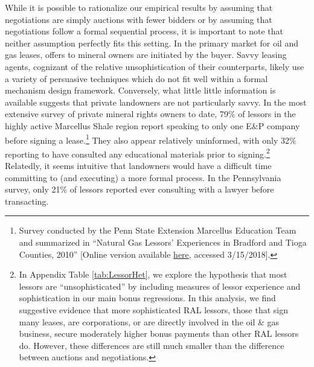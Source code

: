 While it is possible to rationalize our empirical results by assuming that negotiations are simply auctions with fewer bidders or by assuming that negotiations follow a formal sequential process, it is important to note that neither assumption perfectly fits this setting. In the primary market for oil and gas leases, offers to mineral owners are initiated by the buyer. Savvy leasing agents, cognizant of the relative unsophistication of their counterparts, likely use a variety of persuasive techniques which do not fit well within a formal mechanism design framework. Conversely, what little little information is available suggests that private landowners are not particularly savvy.  In the most extensive survey of private mineral rights owners to date, 79\% of lessors in the highly active Marcellus Shale region report speaking to only one E\&P company before signing a lease.\footnote{Survey conducted by the Penn State Extension Marcellus Education Team and summarized in ``Natural Gas Lessors' Experiences in Bradford and Tioga Counties, 2010'' [Online version available \hyperlink{https://extension.psu.edu/natural-gas-lessors-experiences-in-bradford-and-tioga-counties-2010-1}{here}, accessed 3/15/2018].} They also appear relatively uninformed, with only 32\% reporting to have consulted any educational materials prior to signing.\footnote{In Appendix Table \ref{tab:LessorHet}, we explore the hypothesis that most lessors are ``unsophisticated'' by including measures of lessor experience and sophistication in our main bonus regressions.  In this analysis, we find suggestive evidence that more sophisticated RAL lessors, those that sign many leases, are corporations, or are directly involved in the oil \& gas business, secure moderately higher bonus payments than other RAL lessors do.  However, these differences are still much smaller than the difference between auctions and negotiations.} Relatedly, it seems intuitive that landowners would have a difficult time committing to (and executing) a more formal process. In the Pennsylvania survey, only 21\% of lessors reported ever consulting with a lawyer before transacting. 

